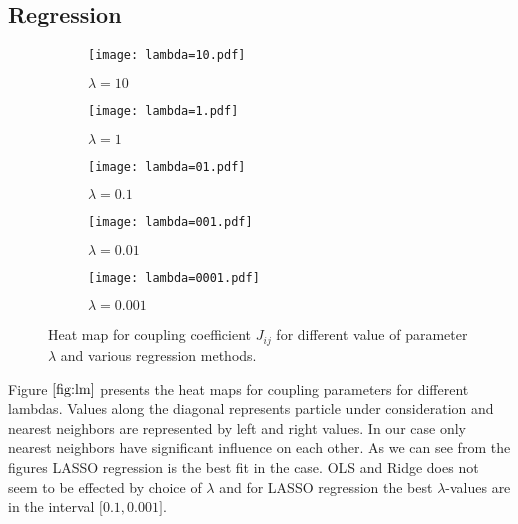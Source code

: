 \documentclass[10pt]{article}
\begin{document}
\subsection{Regression }


\begin{figure}
	\centering
	
	\begin{subfigure}[b]{0.9\textwidth}  
		\centering 
		\texttt{[image: lambda=10.pdf]}
		\caption[]%
		{{\small $\lambda = \num{10}$}}    
		\label{fig:lm10}
	\end{subfigure}
	\hfill
	\begin{subfigure}[b]{0.9\textwidth}   
		\centering 
		\texttt{[image: lambda=1.pdf]}
		\caption[]%
		{{\small $\lambda = \num{1}$}}    
		\label{fig:lm1}
	\end{subfigure}
	\quad
	\begin{subfigure}[b]{0.9\textwidth}   
		\centering 
		\texttt{[image: lambda=01.pdf]}
		\caption[]%
		{{\small $\lambda =\num{0.1}$}}    
		\label{fig:lm01}
	\end{subfigure}
		\quad
	\begin{subfigure}[b]{0.9\textwidth}   
		\centering 
		\texttt{[image: lambda=001.pdf]}
		\caption[]%
		{{\small $\lambda = \num{0.01}$}}    
		\label{fig:lm001}
	\end{subfigure}
	\quad
\begin{subfigure}[b]{0.9\textwidth}   
	\centering 
	\texttt{[image: lambda=0001.pdf]}
	\caption[]%
	{{\small $\lambda = \num{0.001}$}}    
	\label{fig:lm0001}
\end{subfigure}
	\caption[ The average and standard deviation of critical parameters ]
	{\small Heat map for coupling coefficient $J_{ij}$ for different value of parameter $\lambda$ and various regression methods.} 
	\label{fig:lm}
\end{figure}

Figure $\ref{fig:lm}$ presents the heat maps for coupling parameters for different lambdas. Values along the diagonal represents particle under consideration and nearest neighbors are represented by left and right values. In our case only nearest neighbors have significant influence on each other. As we can see from the figures LASSO regression is the best fit in the case. OLS and Ridge does not seem to be effected by choice of $\lambda$ and for LASSO regression the best $\lambda$-values are in the interval $\lbrack \num{0.1} , \num{0.001} \rbrack$.
\end{document}
